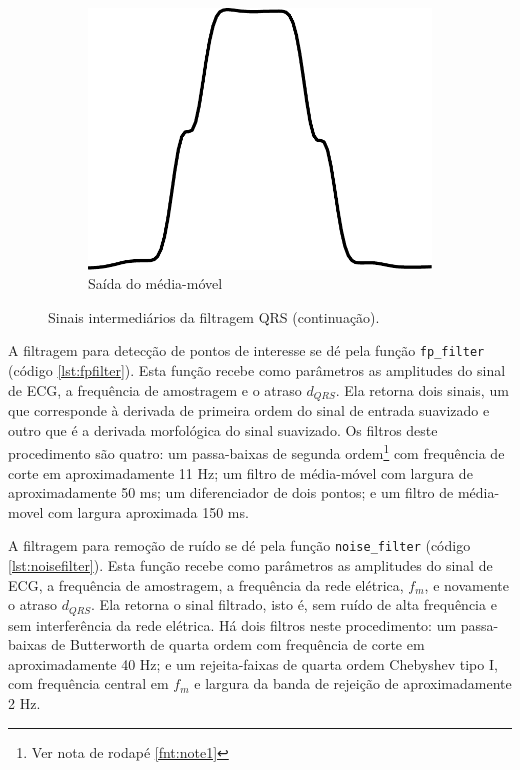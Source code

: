 \begin{figure}[ht]
    \begin{subfigure}[b]{.3\textwidth}
        \includegraphics[width=\textwidth]{figures/chap6-moving-average.pdf}
        \caption{Saída do média-móvel}
    \end{subfigure}
    \caption[Sinais intermediários da filtragem QRS (continuação)]{Sinais intermediários da filtragem QRS (continuação).}
    \label{fig:qrssignals2}
\end{figure}

A filtragem para detecção de pontos de interesse se dé pela função \texttt{fp\_filter} (código \ref{lst:fpfilter}). Esta função recebe como parâmetros as amplitudes do sinal de ECG, a frequência de amostragem e o atraso $d_{QRS}$. Ela retorna dois sinais, um que corresponde à derivada de primeira ordem do sinal de entrada suavizado e outro que é a derivada morfológica \cite{Sun2002} do sinal suavizado. Os filtros deste procedimento são quatro: um passa-baixas de segunda ordem\footnote{Ver nota de rodapé \ref{fnt:note1}} com frequência de corte em aproximadamente 11 Hz; um filtro de média-móvel com largura de aproximadamente 50 ms; um diferenciador de dois pontos; e um filtro de média-movel com largura aproximada 150 ms.

A filtragem para remoção de ruído se dé pela função \texttt{noise\_filter} (código \ref{lst:noisefilter}). Esta função recebe como parâmetros as amplitudes do sinal de ECG, a frequência de amostragem, a frequência da rede elétrica, $f_m$, e novamente o atraso $d_{QRS}$. Ela retorna o sinal filtrado, isto é, sem ruído de alta frequência e sem interferência da rede elétrica. Há dois filtros neste procedimento: um passa-baixas de Butterworth de quarta ordem com frequência de corte em aproximadamente 40 Hz; e um rejeita-faixas de quarta ordem Chebyshev tipo I, com frequência central em $f_m$ e largura da banda de rejeição de aproximadamente 2 Hz.

